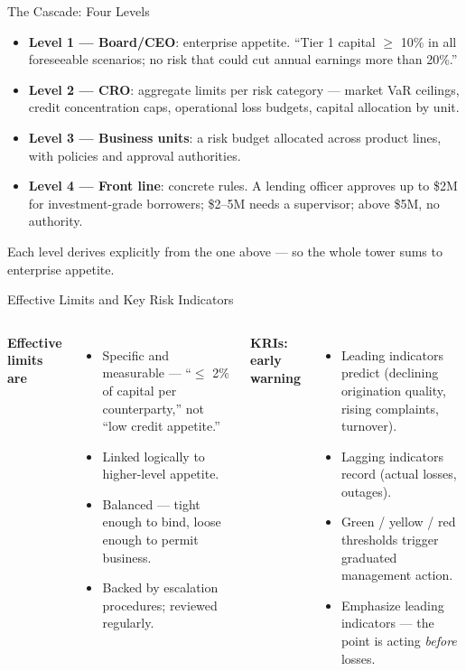 \documentclass[11pt, aspectratio=169]{beamer}
\begin{document}
\begin{frame}{The Cascade: Four Levels}
\begin{itemize}
  \item \textbf{Level 1 --- Board/CEO}: enterprise appetite. ``Tier 1 capital $\geq$ 10\% in all foreseeable scenarios; no risk that could cut annual earnings more than 20\%.''
  \item \textbf{Level 2 --- CRO}: aggregate limits per risk category --- market VaR ceilings, credit concentration caps, operational loss budgets, capital allocation by unit.
  \item \textbf{Level 3 --- Business units}: a \alert{risk budget} allocated across product lines, with policies and approval authorities.
  \item \textbf{Level 4 --- Front line}: concrete rules. A lending officer approves up to \$2M for investment-grade borrowers; \$2--5M needs a supervisor; above \$5M, no authority.
\end{itemize}
\medskip
Each level derives explicitly from the one above --- so the whole tower sums to enterprise appetite.
\end{frame}

\begin{frame}{Effective Limits and Key Risk Indicators}
\begin{columns}[T]
\textbf{Effective limits are}
\begin{itemize}
  \item Specific and measurable --- ``$\leq$ 2\% of capital per counterparty,'' not ``low credit appetite.''
  \item Linked logically to higher-level appetite.
  \item Balanced --- tight enough to bind, loose enough to permit business.
  \item Backed by escalation procedures; reviewed regularly.
\end{itemize}
\textbf{KRIs: early warning}
\begin{itemize}
  \item \alert{Leading} indicators predict (declining origination quality, rising complaints, turnover).
  \item \alert{Lagging} indicators record (actual losses, outages).
  \item Green / yellow / red thresholds trigger graduated management action.
  \item Emphasize leading indicators --- the point is acting \emph{before} losses.
\end{itemize}
\end{columns}
\end{frame}
\end{document}
